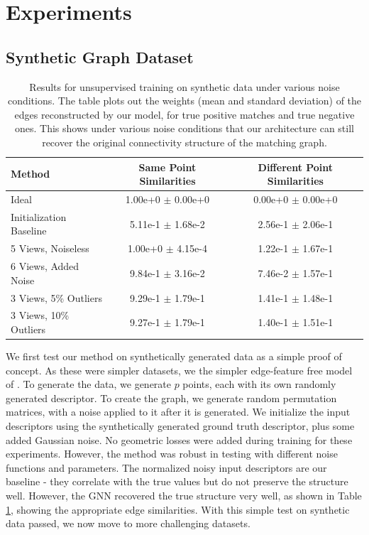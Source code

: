 \documentclass{article} %
\begin{document}
\section{Experiments}

\subsection{Synthetic Graph Dataset}

\begin{table}[t]
\begin{center}
\begin{tabular}{|l|c|c|}
\hline
Method & Same Point Similarities & Different Point Similarities  \\
\hline\hline\hline
Ideal                              & 1.00e+0 $\pm$ 0.00e+0 & 0.00e+0 $\pm$ 0.00e+0 \\ \hline
Initialization Baseline            & 5.11e-1 $\pm$ 1.68e-2 & 2.56e-1 $\pm$ 2.06e-1 \\ \hline
5 Views, Noiseless                 & 1.00e+0 $\pm$ 4.15e-4 & 1.22e-1 $\pm$ 1.67e-1 \\ \hline
6 Views, Added Noise               & 9.84e-1 $\pm$ 3.16e-2 & 7.46e-2 $\pm$ 1.57e-1 \\ \hline
3 Views, 5\% Outliers              & 9.29e-1 $\pm$ 1.79e-1 & 1.41e-1 $\pm$ 1.48e-1 \\ 
3 Views, 10\% Outliers             & 9.27e-1 $\pm$ 1.79e-1 & 1.40e-1 $\pm$ 1.51e-1 \\ \hline

\hline
\end{tabular}
\end{center}
\caption{
Results for unsupervised training on synthetic data under various noise conditions.
The table plots out the weights (mean and standard deviation) of the edges reconstructed by our model, for true positive matches and true negative ones.
This shows under various noise conditions that our architecture can still recover the original connectivity structure of the matching graph.
}
\label{fig:synthtable}
\end{table}

We first test our method on synthetically generated data as a simple proof of concept.
As these were simpler datasets, we the simpler edge-feature free model of \citep{kipf2017semi}.
To generate the data, we generate $p$ points, each with its own randomly generated descriptor.
To create the graph, we generate random permutation matrices, with a noise applied to it after it is generated.
We initialize the input descriptors using the synthetically generated ground truth descriptor, plus some added Gaussian noise.
No geometric losses were added during training for these experiments.
However, the method was robust in testing with different noise functions and parameters.
The normalized noisy input descriptors are our baseline - they correlate with the true values but do not preserve the structure well.
However, the GNN recovered the true structure very well, as shown in Table \ref{fig:synthtable}, showing the appropriate edge similarities.
With this simple test on synthetic data passed, we now move to more challenging datasets.
\end{document}
